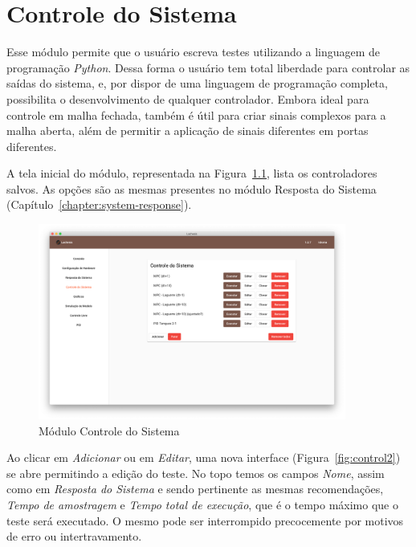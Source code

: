 
\chapter{Controle do Sistema}%
\label{chapter:system-control}

Esse módulo permite que o usuário escreva testes utilizando a linguagem de
programação \textit{Python}. Dessa forma o usuário tem total liberdade para
controlar as saídas do sistema, e, por dispor de uma linguagem de programação
completa, possibilita o desenvolvimento de qualquer controlador. Embora ideal
para controle em malha fechada, também é útil para criar sinais complexos para a
malha aberta, além de permitir a aplicação de sinais diferentes em portas
diferentes.

A tela inicial do módulo, representada na Figura~\ref{fig:control1}, lista os
controladores salvos. As opções são as mesmas presentes no módulo Resposta do
Sistema (Capítulo~\ref{chapter:system-response}).

\begin{figure}[ht!]
    \centering
    \includegraphics[width=0.9\textwidth]{imgs/control1}
    \caption[Módulo Controle do Sistema]{Módulo Controle do Sistema}%
    \label{fig:control1}
\end{figure}

Ao clicar em \textit{Adicionar} ou em \textit{Editar}, uma nova interface
(Figura~\ref{fig:control2}) se abre permitindo a edição do teste. No topo temos
os campos \textit{Nome}, assim como em \textit{Resposta do Sistema} e sendo
pertinente as mesmas recomendações, \textit{Tempo de amostragem} e \textit{Tempo
total de execução}, que é o tempo máximo que o teste será executado. O mesmo
pode ser interrompido precocemente por motivos de erro ou intertravamento.

